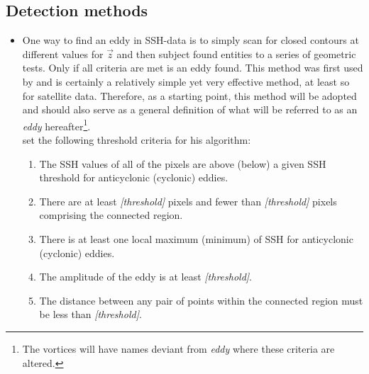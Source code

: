 \subsection{Detection methods} \label{subsec:detectmethods}
\begin{itemize}

	\item
	One way to find an eddy in SSH-data is to simply scan for closed contours at different values for $\vec{z}$ and then subject found entities to a series of geometric tests. Only if all criteria are met is an eddy found. This method was first used by \citet{Chelton2011} and is certainly a relatively simple yet very effective method, at least so for satellite data. Therefore, as a starting point, this method will be adopted and should also serve as a general definition of what will be referred to as an \textit{eddy} hereafter\footnote{The vortices will have names deviant from \textit{eddy} where these criteria are altered.}.\\
	\citeauthor{Chelton2011} set the following threshold criteria for his algorithm:
	\begin{enumerate}
		\item
		The SSH values of all of the pixels are above (below) a given SSH threshold for anticyclonic (cyclonic) eddies.
		\item
		There are at least \textit{[threshold]} pixels and fewer than \textit{[threshold]} pixels comprising the connected region.
		\item
		There is at least one local maximum (minimum) of SSH for anticyclonic (cyclonic) eddies.
		\item
		The amplitude of the eddy is at least \textit{[threshold]}.
		\item
		The distance between any pair of points within the connected region must be less than \textit{[threshold]}.
	\end{enumerate}
	

\end{itemize}
